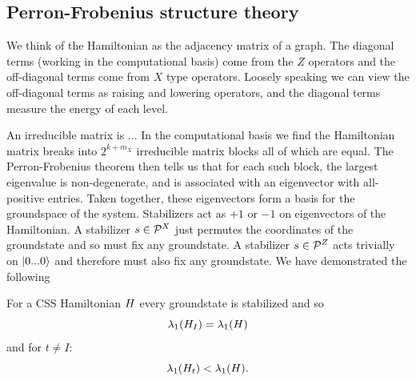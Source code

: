 \documentclass[12pt]{article}
\renewenvironment{framed}[1][\hsize]{%
\def\FrameCommand{{\color{black}\vrule width 3pt}\hspace{0pt}\fboxsep=\FrameSep\colorbox{lightgray}}%
\MakeFramed{\hsize0.8\linewidth\advance\hsize-\width\FrameRestore}}
{\endMakeFramed}
\begin{document}
\subsection{Perron-Frobenius structure theory}


We think of the Hamiltonian as the adjacency matrix of a graph.
The diagonal terms (working in the computational basis)
come from the $Z$ operators and the off-diagonal terms
come from $X$ type operators.
Loosely speaking we can view the off-diagonal terms as 
raising and lowering operators, and the diagonal
terms measure the energy of each level.


An irreducible matrix is ... 
In the computational basis we find the Hamiltonian matrix
breaks into $2^{k+m_X}$ irreducible matrix blocks all of which are equal.
The Perron-Frobenius theorem then tells us that
for each such block, the largest eigenvalue is non-degenerate,
and is associated with an eigenvector with all-positive entries.
Taken together, these eigenvectors form a basis for the
groundspace of the system.
Stabilizers act as $+1$ or $-1$ on eigenvectors
of the Hamiltonian.
A stabilizer $s\in\mathcal{P}^X$ just permutes the
coordinates of the groundstate and so must fix any
groundstate. 
A stabilizer $s\in\mathcal{P}^Z$ acts trivially
on $|{0...0}\rangle$ and therefore must also fix any groundstate.
We have demonstrated the following
\begin{framed}

For a CSS Hamiltonian $H$
every groundstate is stabilized 
and so $$\lambda_1(H_I) = \lambda_1(H)$$
and for $t\ne I:$
$$
\lambda_1(H_t) < \lambda_1(H).
$$
\end{framed}
\end{document}
